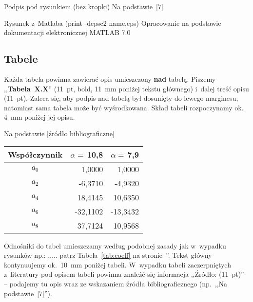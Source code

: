 \documentclass[skorowidz,skroty]{dyplomWEZUT}
\begin{document}
{Podpis pod rysunkiem (bez kropki)\label{fig:rys}}
{Na podstawie~[7]}

{Rysunek z~Matlaba (print -depsc2 name.eps)\label{fig:rys2}}
{Opracowanie na podstawie dokumentacji elektronicznej MATLAB 7.0 \cite{Mathworks2004}}

\subsection{Tabele}

Każda tabela powinna zawierać opis umieszczony \textbf{nad} tabelą. Piszemy ,,\textbf{Tabela~X.X}'' (11~pt, bold, 11~mm poniżej tekstu głównego) i~dalej treść opisu (11~pt). Zaleca się, aby podpis nad tabelą był dosunięty do lewego marginesu, natomiast sama tabela może być wyśrodkowana. Skład tabeli rozpoczynamy ok. 4~mm poniżej jej opisu.

%

{Na podstawie [źródło bibliograficzne]}
{\begin{tabular}{c|r|r}
Współczynnik & $α=\,$10,8 & $α=\,$7,9 \\\hline\hline
$a_0$ &   1,0000 &   1,0000\\
$a_2$ &  -6,3710 &  -4,9320\\
$a_4$ &  18,4145 &  10,6350\\
$a_6$ & -32,1102 & -13,3432\\
$a_8$ &  37,7124 &  10,9568\\
\end{tabular}}

Odnośniki do tabel umieszczamy według podobnej zasady jak w~wypadku rysunków np.: ,,... patrz Tabela~\ref{tab:coeff} na stronie~\pageref{tab:coeff}''. Tekst główny kontynuujemy ok.~10~mm poniżej tabeli. W~wypadku tabeli zaczerpniętych z~literatury pod opisem tabeli powinna znaleźć się informacja ,,Źródło: (11~pt)'' -- podajemy tu opis wraz ze wskazaniem źródła bibliograficznego (np.~,,Na podstawie~[7]'').
\end{document}
